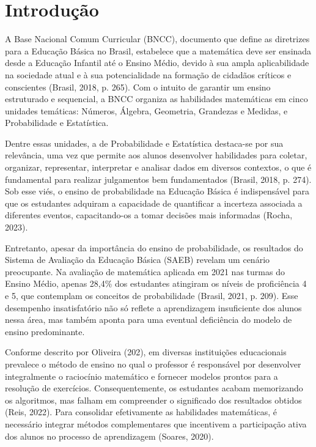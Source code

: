 \chapter{Introdução}
\label{introducao}

A Base Nacional Comum Curricular (BNCC), documento que define as diretrizes para a Educação Básica no Brasil, estabelece que a matemática deve ser ensinada desde a Educação Infantil até o Ensino Médio, devido à sua ampla aplicabilidade na sociedade atual e à sua potencialidade na formação de cidadãos críticos e conscientes (Brasil, 2018, p. 265). Com o intuito de garantir um ensino estruturado e sequencial, a BNCC organiza as habilidades matemáticas em cinco unidades temáticas: Números, Álgebra, Geometria, Grandezas e Medidas, e Probabilidade e Estatística.

Dentre essas unidades, a de Probabilidade e Estatística destaca-se por sua relevância, uma vez que permite aos alunos desenvolver habilidades para coletar, organizar, representar, interpretar e analisar dados em diversos contextos, o que é fundamental para realizar julgamentos bem fundamentados (Brasil, 2018, p. 274). Sob esse viés, o ensino de probabilidade na Educação Básica é indispensável para que os estudantes adquiram a capacidade de quantificar a incerteza associada a diferentes eventos, capacitando-os a tomar decisões mais informadas (Rocha, 2023).

Entretanto, apesar da importância do ensino de probabilidade, os resultados do Sistema de Avaliação da Educação Básica (SAEB) revelam um cenário preocupante. Na avaliação de matemática aplicada em 2021 nas turmas do Ensino Médio, apenas 28,4\% dos estudantes atingiram os níveis de proficiência 4 e 5,  que contemplam os conceitos de probabilidade (Brasil, 2021, p. 209). Esse desempenho insatisfatório não só reflete a aprendizagem insuficiente dos alunos nessa área, mas também aponta para uma eventual deficiência do modelo de ensino predominante. 

Conforme descrito por Oliveira (202), em diversas instituições educacionais prevalece o método de ensino no qual o professor é responsável por desenvolver integralmente o raciocínio matemático e fornecer modelos prontos para a resolução de exercícios. Consequentemente, os estudantes acabam memorizando os algoritmos, mas falham em compreender o significado dos resultados obtidos (Reis, 2022). Para consolidar efetivamente as habilidades matemáticas, é necessário integrar métodos complementares que incentivem a participação ativa dos alunos no processo de aprendizagem (Soares, 2020).

